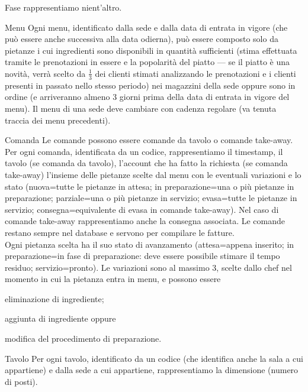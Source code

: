 \begin{center}
\begin{reqtable}{Fase}
rappresentiamo nient'altro.
\end{reqtable}
\begin{reqtable}{Menu}
Ogni menu, identificato dalla sede e dalla data di entrata in vigore (che può essere
anche successiva alla data odierna), può essere composto solo da pietanze i cui ingredienti
sono disponibili in quantità sufficienti (stima effettuata tramite le prenotazioni
in essere e la popolarità del piatto --- se il piatto è una novità, verrà scelto
da \(\frac{1}{3}\) dei clienti stimati analizzando le prenotazioni e i clienti
presenti in passato nello stesso periodo) nei magazzini della sede oppure sono in
ordine (e arriveranno almeno 3 giorni prima della data di entrata in vigore del
menu). Il menu di una sede deve cambiare con cadenza regolare (va tenuta traccia
dei menu precedenti).
\end{reqtable}
\begin{reqtable}{Comanda}
Le comande possono essere comande da tavolo o comande take-away.
Per ogni comanda, identificata da un codice, rappresentiamo il timestamp, il
tavolo (se comanda da tavolo), l'account che ha fatto la richiesta (se comanda
take-away) l'insieme delle pietanze scelte dal menu con le eventuali
variazioni e lo stato (nuova=tutte le pietanze in attesa; in preparazione=una o più
pietanze in preparazione; parziale=una o più pietanze in servizio; evasa=tutte le
pietanze in servizio; consegna=equivalente di evasa in comande take-away). Nel
caso di comande take-away rappresentiamo anche la consegna associata. Le comande
restano sempre nel database e servono per compilare le fatture. \\
Ogni pietanza scelta ha il suo stato di avanzamento (attesa=appena inserito; in
preparazione=in fase di preparazione: deve essere possibile stimare il tempo residuo;
servizio=pronto). 
Le variazioni sono al massimo 3, scelte dallo chef nel momento in cui la
pietanza entra in menu, e possono essere
\begin{inparaenum}[a)]
\item eliminazione di ingrediente;
\item aggiunta di ingrediente oppure
\item modifica del procedimento di preparazione.
\end{inparaenum}
\end{reqtable}
\begin{reqtable}{Tavolo}
Per ogni tavolo, identificato da un codice (che identifica anche la sala a cui appartiene)
e dalla sede a cui appartiene, rappresentiamo la dimensione (numero di posti).

\end{reqtable}
\end{center}
